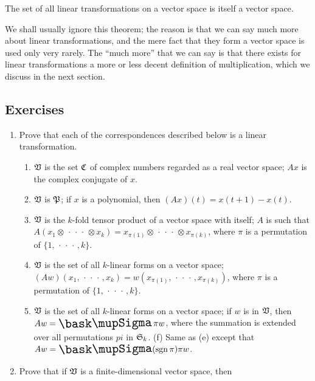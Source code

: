 \begin{theorem}
    The set of all linear transformations on a vector space is itself a vector
    space.
\end{theorem}

We shall usually ignore this theorem; the reason is that we can say
much more about linear transformations, and the mere fact that they form a
vector space is used only very rarely. The ``much more'' that we can say is that
there exists for linear transformations a more or less decent definition of
multiplication, which we discuss in the next section.

{\small
\subsection*{Exercises}
\begin{enumerate}[label=(\arabic*), wide]
    \item Prove that each of the correspondences described below is a linear transformation.
    \begin{enumerate}[label=(\alph*), wide, nosep]
        \item \(\mathfrak{V}\) is the set \(\mathfrak{C}\) of complex numbers regarded as
        a real vector space; \(Ax\) is the complex conjugate of \(x\).
        \item \(\mathfrak{V}\) is \(\mathfrak{P}\); if \(x\) is a polynomial, then
        \((Ax)(t) = x(t + 1) - x(t)\).
        \item \(\mathfrak{V}\) is the \(k\)-fold tensor product of a vector space with
        itself; \(A\) is such that \(A(x_1 \otimes \,\cdot\,\cdot\,\cdot\, \otimes x_k) =
        x_{\pi(1)} \otimes \,\cdot\,\cdot\,\cdot\, \otimes x_{\pi(k)}\), where \(\pi\) is a
        permutation of \(\{1, \,\cdot\,\cdot\,\cdot\,, k\}\).
        \item \(\mathfrak{V}\) is the set of all \(k\)-linear forms on a vector space;
        \((Aw)(x_1, \,\cdot\,\cdot\,\cdot\,, x_k) = w(x_{\pi(1)}, \,\cdot\,\cdot\,\cdot\,, x_{\pi(k)})\), where
        \(\pi\) is a permutation of \(\{1, \,\cdot\,\cdot\,\cdot\,, k\}\).
        \item \(\mathfrak{V}\) is the set of all \(k\)-linear forms on a vector space;
        if \(w\) is in \(\mathfrak{V}\), then \(Aw = \sumx \pi w\), where the
        summation is extended over all permutations \(pi\) in \(\frak{S}_k\).
        (f) Same as (e) except that \(Aw = \sumx (\sign \pi) \pi w\).
    \end{enumerate}
    \item Prove that if \(\mathfrak{V}\) is a finite-dimensional vector space, then

\end{enumerate}}
